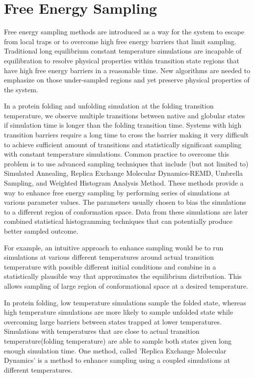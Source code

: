 \documentclass[../talant.diss.submit.tex]{subfiles}
\begin{document}
%
\section{\textbf{Free Energy Sampling}}\label{sect:two_seven}
%
Free energy sampling methods are introduced as a way for the system to escape from local
traps or to overcome high free energy barriers that limit sampling.
Traditional long equilibrium constant temperature simulations 
are incapable of equilibration to resolve physical properties within transition state regions
that have high free energy barriers in a reasonable time.
New algorithms are needed to emphasize on those under-sampled regions and yet preserve physical
properties of the system.

In a protein folding and unfolding simulation at the folding transition
temperature, we observe multiple transitions between native and globular states
if simulation time is longer than the folding transition time.  Systems with
high transition barriers require a long time to cross the barrier making it very
difficult to achieve sufficient amount of transitions and statistically
significant sampling with constant temperature simulations.  Common practice to
overcome this problem is to use advanced sampling techniques that include (but
not limited to) Simulated Annealing, Replica Exchange Molecular Dynamics-REMD,
Umbrella Sampling, and Weighted Histogram Analysis Method. These methods provide
a way to enhance free energy sampling by performing series of simulations at
various parameter values. The parameters usually chosen to bias the simulations
to a different region of conformation space. Data from these simulations are later
combined statistical histogramming techniques that can potentially produce
better sampled outcome.

For example, an intuitive approach to enhance sampling would be to run simulations at
various different temperatures around actual transition temperature with possible different
initial conditions and combine in a statistically plausible way that approximates the
equilibrium distribution.
This allows sampling of large region of conformational space at a desired temperature.

In protein folding, low temperature simulations sample the folded state, whereas
high temperature simulations are more likely to sample unfolded state while
overcoming large barriers between states trapped at lower temperatures.
Simulations with temperatures that are close to actual transition
temperature(folding temperature) are able to sample both states given long
enough simulation time.  One method, called 'Replica Exchange Molecular
Dynamics' is a method to enhance sampling using a coupled simulations at
different temperatures.
\end{document}
